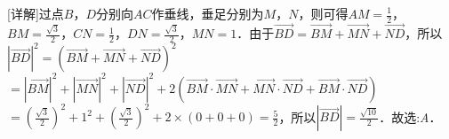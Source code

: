 \documentclass[fontset=none]{ctexart}
\begin{document}
\noindent\begin{minipage}[t]{46.368mm}\raggedright [详解]过点\(B\)，\(D\)分别向\(AC\)作垂线，垂足分别为\(M\)，\(N\)，则可得\(AM = \frac{1}{2}\)，\(BM = \frac{\sqrt{3}}{2}\)，\(CN = \frac{1}{2}\)，\(DN = \frac{\sqrt{3}}{2}\)，\(MN = 1\)．由于\(\overrightarrow{BD} = \overrightarrow{BM} + \overrightarrow{MN} + \overrightarrow{ND}\)，所以\(|\overrightarrow{BD}|^{2} = {(\overrightarrow{BM} + \overrightarrow{MN} + \overrightarrow{ND})}^{2}\)\(= |\overrightarrow{BM}|^{2} + |\overrightarrow{MN}|^{2} + |\overrightarrow{ND}|^{2} + 2(\overrightarrow{BM} \cdot \overrightarrow{MN} + \overrightarrow{MN} \cdot \overrightarrow{ND} + \overrightarrow{BM} \cdot \overrightarrow{ND})\)\(= ( \frac{\sqrt{3}}{2} )^{2} + 1^{2} + ( \frac{\sqrt{3}}{2} )^{2} + 2 \times (0 + 0 + 0) = \frac{5}{2}\)，所以\(|\overrightarrow{BD}| = \frac{\sqrt{10}}{2}\)．故选:\emph{A}．\end{minipage}\par\newpage
\end{document}
